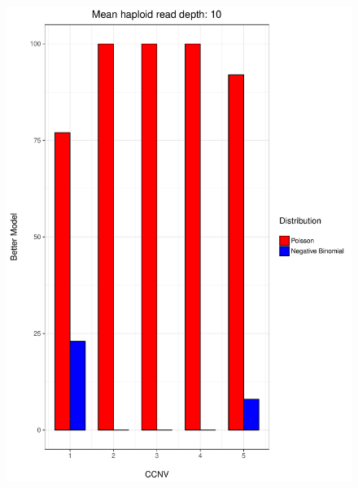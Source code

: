\documentclass[11pt]{article}
\begin{document}
\begin{figure}
\begin{center}
\includegraphics[scale=0.28]{../Results/Second_Analysis/Better_model_bar10.pdf}

\end{center}
\end{figure}
\end{document}
